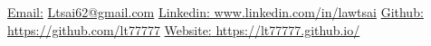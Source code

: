 \documentclass[UTF8]{resume} %
\begin{document}
  \scriptsize\underline{Email:}
            \href{Ltsai62@gmail.com}{Ltsai62@gmail.com}     {  }
            {\scriptsize\underline{Linkedin:}}\href{https://www.linkedin.com/in/lawtsai}{ www.linkedin.com/in/lawtsai}
            {        }
           {\scriptsize\underline{Github:}}\href{https://github.com/lt77777}{ https://github.com/lt77777}
           {        }
           {\scriptsize\underline{Website:}}\href{https://lt77777.github.io/}{ https://lt77777.github.io/}\\
~\vspace{-0.6cm}


\end{document}
